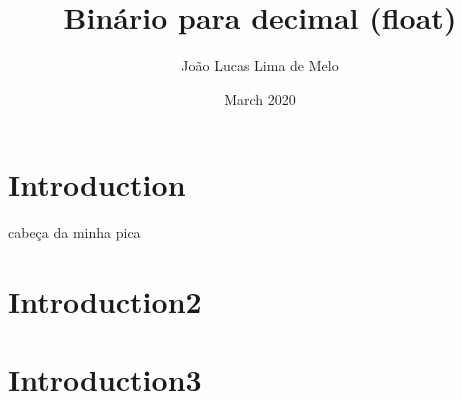 \documentclass{article}
\title{Binário para decimal (float)}
\author{João Lucas Lima de Melo}
\date{March 2020}
\begin{document}
\maketitle

\section{Introduction}
cabeça da minha pica\par
\section{Introduction2}
\section{Introduction3}
\end{document}
